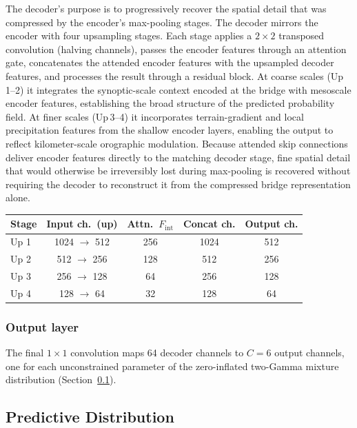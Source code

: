 \documentclass[11pt]{article}
\begin{document}
The decoder's purpose is to progressively recover the spatial
detail that was compressed by the encoder's max-pooling stages.
The decoder mirrors the encoder with four upsampling stages.
Each stage applies a $2 \times 2$ transposed convolution (halving
channels), passes the encoder features through an attention gate,
concatenates the attended encoder features with the upsampled
decoder features, and processes the result through a residual block.
At coarse scales (Up\,1--2) it integrates the synoptic-scale context
encoded at the bridge with mesoscale encoder features, establishing
the broad structure of the predicted probability field.  At finer
scales (Up\,3--4) it incorporates terrain-gradient and local
precipitation features from the shallow encoder layers, enabling
the output to reflect kilometer-scale orographic modulation.
Because attended skip connections deliver encoder features directly
to the matching decoder stage, fine spatial detail that would
otherwise be irreversibly lost during max-pooling is recovered
without requiring the decoder to reconstruct it from the compressed
bridge representation alone.

\begin{center}
\begin{tabular}{lcccc}
\toprule
Stage & Input ch.\ (up) & Attn.\ $F_{\text{int}}$ &
  Concat ch. & Output ch. \\
\midrule
Up 1 & 1024 $\to$ 512 & 256 & 1024 & 512 \\
Up 2 & 512 $\to$ 256 & 128 & 512 & 256 \\
Up 3 & 256 $\to$ 128 & 64 & 256 & 128 \\
Up 4 & 128 $\to$ 64 & 32 & 128 & 64 \\
\bottomrule
\end{tabular}
\end{center}

\subsubsection{Output layer}
\label{sec:output_layer}

The final $1 \times 1$ convolution maps 64 decoder channels to
$C = 6$ output channels, one for each unconstrained parameter of
the zero-inflated two-Gamma mixture distribution
(Section~\ref{sec:distribution}).

\subsection{Predictive Distribution}
\label{sec:distribution}
\end{document}
